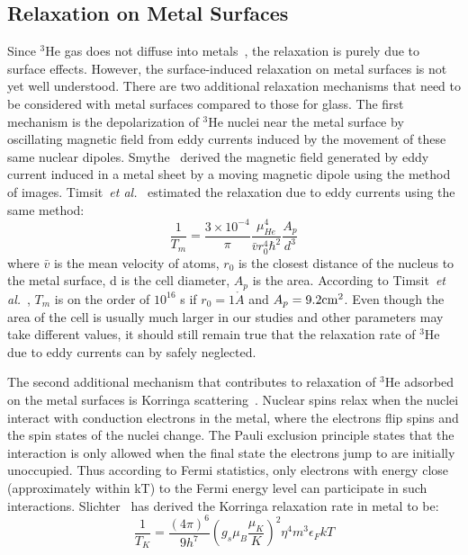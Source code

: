 \subsection{Relaxation on Metal Surfaces}

Since $^{3}$He gas does not diffuse into metals~\cite{barrer}, the relaxation is purely due to surface effects. However, the surface-induced relaxation on metal surfaces is not yet well understood. There are two additional relaxation mechanisms that need to be considered with metal surfaces compared to those for glass. The first mechanism is the depolarization of $^{3}$He nuclei near the metal surface by oscillating magnetic field from eddy currents induced by the movement of these same nuclear dipoles. Smythe~\cite{Smythe} derived the magnetic field generated by eddy current induced in a metal sheet by a moving magnetic dipole using the method of images. Timsit~\emph{et al.}~\cite{Timsit} estimated the relaxation due to eddy currents using the same method:
\begin{equation}
\frac{1}{T_m} = \frac{3\times 10^{-4}}{\pi} \frac{\mu_{He}^4}{\bar{v}r_{0}^{4}\hbar^{2}}\frac{A_p}{d^3}
\end{equation}
where $\bar{v}$ is the mean velocity of atoms, $r_0$ is the closest distance of the nucleus to the metal surface, d is the cell diameter, $A_p$ is the area. According to Timsit~\emph{et al.}~\cite{Timsit}, $T_m$ is on the order of $10^{16}$ s if $r_0=1\mathring{A}$ and $A_p = 9.2{\rm cm}^2$. Even though the area of the cell is usually much larger in our studies and other parameters may take different values, it should still remain true that the relaxation rate of $^{3}$He due to eddy currents can by safely neglected.

The second additional mechanism that contributes to relaxation of $^{3}$He adsorbed on the metal surfaces is Korringa scattering~\cite{Korringa}. Nuclear spins relax when the nuclei interact with conduction electrons in the metal, where the electrons flip spins and the spin states of the nuclei change. The Pauli exclusion principle states that the interaction is only allowed when the final state the electrons jump to are initially unoccupied. Thus according to Fermi statistics, only electrons with energy close (approximately within kT) to the Fermi energy level can participate in such interactions. Slichter~\cite{Slichter} has derived the Korringa relaxation rate in metal to be:
\begin{equation}
\frac{1}{T_K}=\frac{(4\pi)^6}{9h^7}(g_s\mu_B \frac{\mu_K}{K})^2 \eta^4m^3\epsilon_F kT
\end{equation}

